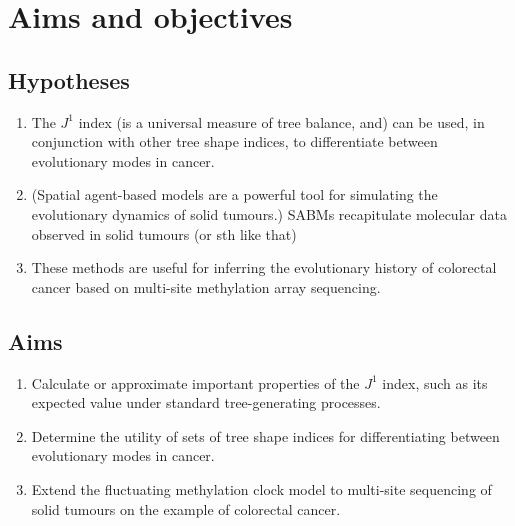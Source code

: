 \section{Aims and objectives}

\subsection{Hypotheses}
\begin{enumerate}
    \item The $J^1$ index (is a universal measure of tree balance, and) can be used, in conjunction with other
        tree shape indices, to differentiate between evolutionary modes in cancer.
    \item (Spatial agent-based models are a powerful tool for simulating the evolutionary dynamics of solid tumours.) SABMs recapitulate molecular data observed in solid tumours (or sth like that)
    \item These methods are useful for inferring the evolutionary history of colorectal cancer based on multi-site
        methylation array sequencing.
\end{enumerate}

\subsection{Aims}
\begin{enumerate}
    \item Calculate or approximate important properties of the $J^1$ index, such as its expected value under
        standard tree-generating processes.
    \item Determine the utility of sets of tree shape indices for differentiating between evolutionary modes in cancer.
    \item Extend the fluctuating methylation clock model to multi-site sequencing of solid tumours on the
        example of colorectal cancer.
\end{enumerate}

